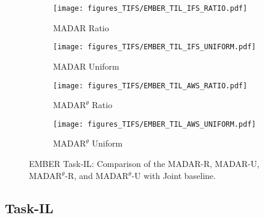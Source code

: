 \begin{figure}[!t]
    \centering
    \begin{subfigure}{0.485\linewidth}
        \centering
        \texttt{[image: figures\_TIFS/EMBER\_TIL\_IFS\_RATIO.pdf]}
        \label{fig:EMBER_TIL_IFS_R}
        \vspace{-0.4cm}
        \caption{MADAR Ratio}
    \end{subfigure}
    \hfill
    \begin{subfigure}{0.485\linewidth}
        \centering
        \texttt{[image: figures\_TIFS/EMBER\_TIL\_IFS\_UNIFORM.pdf]}
        \label{fig:EMBER_TIL_IFS_U}
        \vspace{-0.4cm}
        \caption{MADAR Uniform}
    \end{subfigure}
    \vfill
    \begin{subfigure}{0.485\linewidth}
        \centering
        \texttt{[image: figures\_TIFS/EMBER\_TIL\_AWS\_RATIO.pdf]}
        \label{fig:EMBER_TIL_AWS_R}
        \vspace{-0.4cm}
        \caption{MADAR$^\theta$ Ratio}
    \end{subfigure}
    \hfill
    \begin{subfigure}{0.485\linewidth}
        \centering
        \texttt{[image: figures\_TIFS/EMBER\_TIL\_AWS\_UNIFORM.pdf]}
        \label{fig:EMBER_TIL_AWS_U}
        \vspace{-0.4cm}
        \caption{MADAR$^\theta$ Uniform}
    \end{subfigure}

    \caption{EMBER Task-IL: Comparison of the MADAR-R, MADAR-U, MADAR$^\theta$-R, and MADAR$^\theta$-U with Joint baseline.}
    \label{fig:ember_TIL}
    \vspace{-0.3cm}
\end{figure}

























\subsection{Task-IL}
\label{taskilexps-ember}


